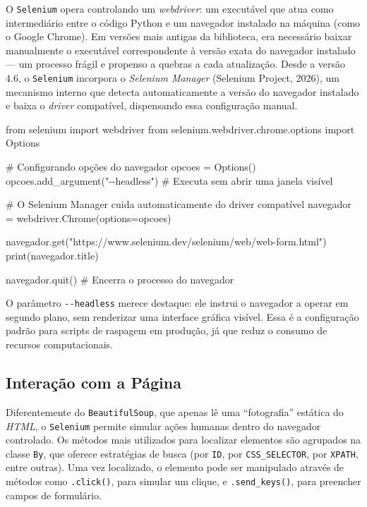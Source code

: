 \documentclass[
  brazilian,
  letterpaper,
  DIV=11,
  numbers=noendperiod]{scrreprt}
\newenvironment{Shaded}{\begin{snugshade}}{\end{snugshade}}
\newcommand{\BuiltInTok}[1]{\textcolor[rgb]{0.00,0.23,0.31}{#1}}
\newcommand{\CommentTok}[1]{\textcolor[rgb]{0.37,0.37,0.37}{#1}}
\newcommand{\ImportTok}[1]{\textcolor[rgb]{0.00,0.46,0.62}{#1}}
\newcommand{\NormalTok}[1]{\textcolor[rgb]{0.00,0.23,0.31}{#1}}
\newcommand{\OperatorTok}[1]{\textcolor[rgb]{0.37,0.37,0.37}{#1}}
\newcommand{\StringTok}[1]{\textcolor[rgb]{0.13,0.47,0.30}{#1}}
\begin{document}
O \texttt{Selenium} opera controlando um \emph{webdriver}: um executável
que atua como intermediário entre o código Python e um navegador
instalado na máquina (como o Google Chrome). Em versões mais antigas da
biblioteca, era necessário baixar manualmente o executável
correspondente à versão exata do navegador instalado --- um processo
frágil e propenso a quebras a cada atualização. Desde a versão 4.6, o
\texttt{Selenium} incorpora o \emph{Selenium Manager} (Selenium Project,
2026), um mecanismo interno que detecta automaticamente a versão do
navegador instalado e baixa o \emph{driver} compatível, dispensando essa
configuração manual.

\begin{Shaded}
\begin{Highlighting}[]
\ImportTok{from}\NormalTok{ selenium }\ImportTok{import}\NormalTok{ webdriver}
\ImportTok{from}\NormalTok{ selenium.webdriver.chrome.options }\ImportTok{import}\NormalTok{ Options}

\CommentTok{\# Configurando opções do navegador}
\NormalTok{opcoes }\OperatorTok{=}\NormalTok{ Options()}
\NormalTok{opcoes.add\_argument(}\StringTok{"{-}{-}headless"}\NormalTok{)  }\CommentTok{\# Executa sem abrir uma janela visível}

\CommentTok{\# O Selenium Manager cuida automaticamente do driver compatível}
\NormalTok{navegador }\OperatorTok{=}\NormalTok{ webdriver.Chrome(options}\OperatorTok{=}\NormalTok{opcoes)}

\NormalTok{navegador.get(}\StringTok{"https://www.selenium.dev/selenium/web/web{-}form.html"}\NormalTok{)}
\BuiltInTok{print}\NormalTok{(navegador.title)}

\NormalTok{navegador.quit()  }\CommentTok{\# Encerra o processo do navegador}
\end{Highlighting}
\end{Shaded}

O parâmetro \texttt{-\/-headless} merece destaque: ele instrui o
navegador a operar em segundo plano, sem renderizar uma interface
gráfica visível. Essa é a configuração padrão para scripts de raspagem
em produção, já que reduz o consumo de recursos computacionais.

\subsection{Interação com a
Página}\label{interauxe7uxe3o-com-a-puxe1gina}

Diferentemente do \texttt{BeautifulSoup}, que apenas lê uma
``fotografia'' estática do \emph{HTML}, o \texttt{Selenium} permite
simular ações humanas dentro do navegador controlado. Os métodos mais
utilizados para localizar elementos são agrupados na classe \texttt{By},
que oferece estratégias de busca (por \texttt{ID}, por
\texttt{CSS\_SELECTOR}, por \texttt{XPATH}, entre outras). Uma vez
localizado, o elemento pode ser manipulado através de métodos como
\texttt{.click()}, para simular um clique, e \texttt{.send\_keys()},
para preencher campos de formulário.
\end{document}
